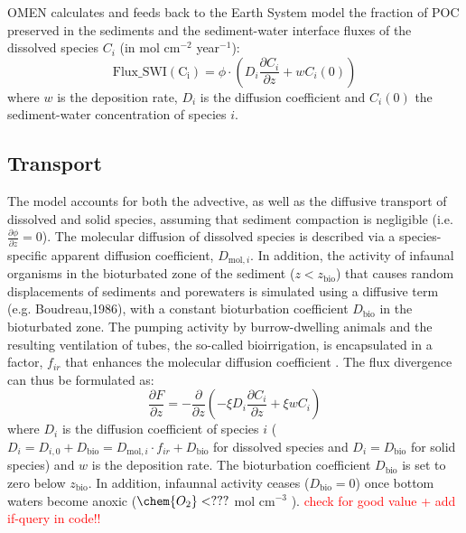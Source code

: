 \documentclass[gmd, manuscript]{copernicus}
\begin{document}
OMEN calculates and feeds back to the Earth System model the fraction of POC preserved in the sediments and the sediment-water interface fluxes of the dissolved species $C_i$ (in mol cm$^{-2}$ year$^{-1}$):
\begin{equation}
\mathrm{Flux\_SWI(C_i)} = \phi \cdot \left(D_i \frac{\partial C_i}{\partial z} + w C_i(0) \right)
\end{equation}
where $w$ is the deposition rate, $D_i$ is the diffusion coefficient and $C_i(0)$ the sediment-water concentration of species $i$. 

\subsection{Transport}\label{subsec:Transport}
The model accounts for both the advective, as well as the diffusive transport of dissolved and solid species, assuming that sediment compaction is negligible (i.e. $\frac{\partial \phi}{\partial z}=0$). 
The molecular diffusion of dissolved species is described via a species-specific apparent diffusion coefficient, $D_{\mathrm{mol},i}$. 
In addition, the activity of infaunal organisms in the bioturbated zone of the sediment ($z<z_{\mathrm{bio}}$) that causes random 
displacements of sediments and porewaters is simulated using a diffusive term (e.g. Boudreau,1986), with a constant bioturbation coefficient $D_{\mathrm{bio}}$ in the bioturbated zone. 
The pumping activity by burrow-dwelling animals and the resulting ventilation of tubes, the so-called bioirrigation, is encapsulated in a factor, $f_{ir}$ that enhances the molecular diffusion coefficient 
\citep[ hence, $D_{i,0}=D_{\mathrm{mol},i}\cdot f_{ir}$,][]{soetaert1996dynamic}. The flux divergence can thus be formulated as:
\begin{equation}
\frac{\partial F}{\partial z}=-\frac{\partial}{\partial z}\left( -\xi D_i \frac{\partial C_i}{\partial z} +\xi w C_i\right) \label{Eq_flux_divergence}
\end{equation}
where $D_i$ is the diffusion coefficient of species $i$ ($D_i=D_{i,0}+D_{\mathrm{bio}}=D_{\mathrm{mol},i}\cdot f_{ir}+D_{\mathrm{bio}}$ for dissolved species and $D_i=D_{\mathrm{bio}}$ for solid species) and $w$ is the 
deposition rate. 
The bioturbation coefficient $D_{\mathrm{bio}}$ is set to zero below $z_{\mathrm{bio}}$. In addition, infaunnal activity ceases ($D_{\mathrm{bio}}=0$) once bottom waters become anoxic ($\chem{O_2} < ???$ mol cm$^{-3}$ ). 
\textcolor{red}{check for good value + add if-query in code!!}
\end{document}
